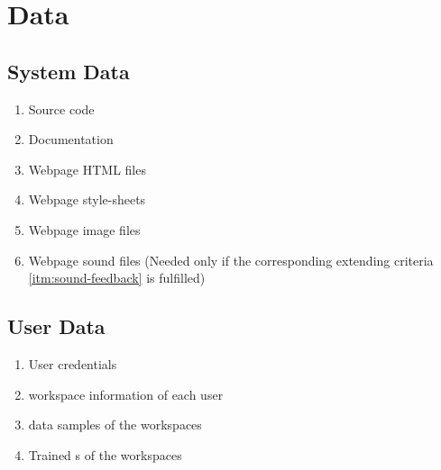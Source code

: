 \section{Data}
\subsection{System Data}
\begin{enumerate}[{label = \textbf{/D{\protect\twodigits{\arabic{enumi}}}0/}, leftmargin = *}]
    \item Source code
    \item Documentation
    \item Webpage \gls{HTML} files
    \item Webpage \glspl{style-sheet}
    \item Webpage image files
    \item Webpage sound files (Needed only if the corresponding extending criteria \ref{itm:sound-feedback} is fulfilled)
\end{enumerate}

\subsection{User Data}
\begin{enumerate}[resume*]
    \item User credentials
    \item \Gls{workspace} information of each user
    \item \Gls{data sample}s of the \glspl{workspace}
    \item Trained s of the \glspl{workspace}
\end{enumerate}
